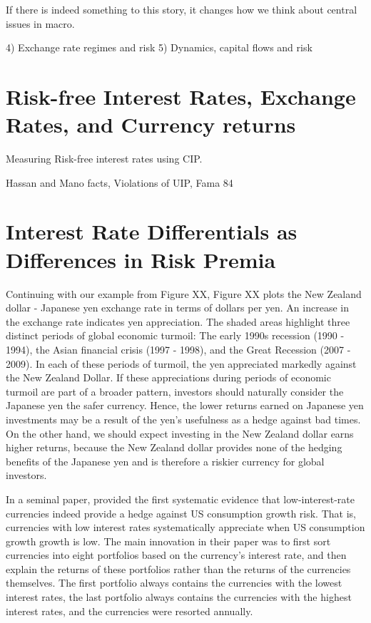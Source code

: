 \documentclass[12pt,letter]{article}
\theoremstyle{break} \theorembodyfont{\normalfont\itshape}
\theoremstyle{break}
\theoremstyle{break} \theorembodyfont{\normalfont\itshape}
\theoremstyle{break} \theorembodyfont{\normalfont\itshape}
\begin{document}
If there is indeed something to this story, it changes how we think
about central issues in macro.

 4) Exchange rate regimes and risk 5)
Dynamics, capital flows and risk


\section{Risk-free Interest Rates, Exchange Rates, and Currency
  returns}

Measuring Risk-free interest rates using CIP.



Hassan and Mano facts, Violations of UIP, Fama 84



\section{Interest Rate Differentials as Differences in Risk Premia}


Continuing with our example from Figure XX, Figure XX plots the New
Zealand dollar - Japanese yen exchange rate in terms of dollars per
yen. An increase in the exchange rate indicates yen appreciation.
The shaded areas highlight three distinct periods of global economic
turmoil: The early 1990s recession (1990 - 1994), the Asian financial
crisis (1997 - 1998), and the Great Recession (2007 - 2009). In each of these periods of turmoil, the yen appreciated markedly against the New Zealand Dollar. If these appreciations during periods of economic
turmoil are part of a broader pattern, investors should naturally consider the Japanese yen the safer
currency. Hence, the lower returns earned on Japanese yen investments 
may be a result of the yen's usefulness as a hedge against bad times. 
On the other hand, we should expect investing in the New Zealand dollar 
earns higher returns, because the New Zealand dollar provides none of 
the hedging benefits of the Japanese yen and is therefore a riskier 
currency for global investors.

In a seminal paper, \citet{LustigVerdelhan2007} provided  the first systematic evidence 
that low-interest-rate currencies indeed provide a hedge against US consumption growth risk. That is, currencies with low interest rates systematically appreciate when US consumption growth growth is low. 
The main innovation in their paper was to first sort currencies into eight 
portfolios based on the currency's interest rate, and then explain the returns 
of these portfolios rather than the returns of the currencies themselves. The 
first portfolio always contains the currencies with the lowest interest rates, 
the last portfolio always contains the currencies with the highest interest 
rates, and the currencies were resorted annually.
\end{document}
